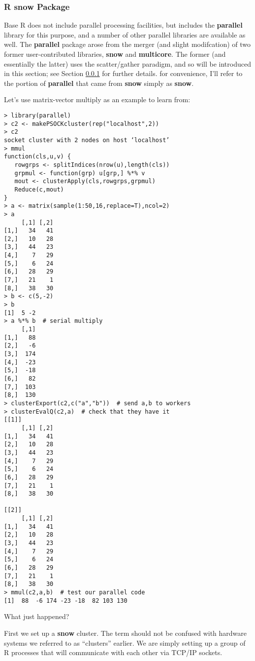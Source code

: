 \subsubsection{R snow Package}
\label{snowintro}

Base R does not include parallel processing facilities, but includes the
{\bf parallel} library for this purpose, and a number of other parallel
libraries are available as well.  The {\bf parallel} package arose from
the merger (and slight modifcation) of two former user-contributed
libraries, {\bf snow} and {\bf multicore}.  The former (and essentially
the latter) uses the scatter/gather paradigm, and so will be introduced
in this section; see Section \ref{snowintro} for further details.  for
convenience, I'll refer to the portion of {\bf parallel} that came from
{\bf snow} simply as {\bf snow}.

Let's use matrix-vector multiply as an example to learn from:

\begin{lstlisting}
> library(parallel)
> c2 <- makePSOCKcluster(rep("localhost",2))
> c2
socket cluster with 2 nodes on host ‘localhost’
> mmul
function(cls,u,v) {
   rowgrps <- splitIndices(nrow(u),length(cls))
   grpmul <- function(grp) u[grp,] %*% v
   mout <- clusterApply(cls,rowgrps,grpmul)
   Reduce(c,mout)
}
> a <- matrix(sample(1:50,16,replace=T),ncol=2)
> a
     [,1] [,2]
[1,]   34   41
[2,]   10   28
[3,]   44   23
[4,]    7   29
[5,]    6   24
[6,]   28   29
[7,]   21    1
[8,]   38   30
> b <- c(5,-2)
> b
[1]  5 -2
> a %*% b  # serial multiply
     [,1]
[1,]   88
[2,]   -6
[3,]  174
[4,]  -23
[5,]  -18
[6,]   82
[7,]  103
[8,]  130
> clusterExport(c2,c("a","b"))  # send a,b to workers
> clusterEvalQ(c2,a)  # check that they have it
[[1]]
     [,1] [,2]
[1,]   34   41
[2,]   10   28
[3,]   44   23
[4,]    7   29
[5,]    6   24
[6,]   28   29
[7,]   21    1
[8,]   38   30

[[2]]
     [,1] [,2]
[1,]   34   41
[2,]   10   28
[3,]   44   23
[4,]    7   29
[5,]    6   24
[6,]   28   29
[7,]   21    1
[8,]   38   30
> mmul(c2,a,b)  # test our parallel code
[1]  88  -6 174 -23 -18  82 103 130
\end{lstlisting}

What just happened?

First we set up a {\bf snow} cluster.  The term should not be confused
with hardware systems we referred to as ``clusters'' earlier.  We are
simply setting up a group of R processes that will communicate with each
other via TCP/IP sockets.

